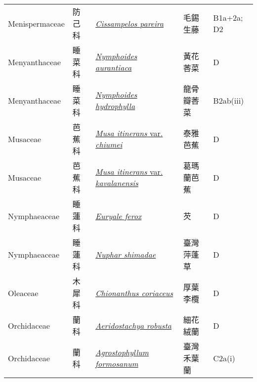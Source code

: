 {\begin{longtable}{p{2.5cm}p{2cm}p{5cm}p{2.5cm}p{3cm}}
    Menispermaceae & 防己科 & \href{http://www.theplantlist.org/tpl1.1/search?q=Cissampelos+pareira}{\textit{Cissampelos pareira} } & 毛錫生藤 & B1a+2a; D2 \index{Cissampelos@\textit{Cissampelos}!pareira@\textit{pareira}}  \index{毛錫生藤} \\
    Menyanthaceae & 睡菜科 & \href{http://www.theplantlist.org/tpl1.1/search?q=Nymphoides+aurantiaca}{\textit{Nymphoides aurantiaca} } & 黃花莕菜 & D \index{Nymphoides@\textit{Nymphoides}!aurantiaca@\textit{aurantiaca}}  \index{黃花莕菜} \\
    Menyanthaceae & 睡菜科 & \href{http://www.theplantlist.org/tpl1.1/search?q=Nymphoides+hydrophylla}{\textit{Nymphoides hydrophylla} } & 龍骨瓣莕菜 & B2ab(iii) \index{Nymphoides@\textit{Nymphoides}!hydrophylla@\textit{hydrophylla}}  \index{龍骨瓣莕菜} \\
    Musaceae & 芭蕉科 & \href{http://www.theplantlist.org/tpl1.1/search?q=Musa+itinerans+var.+chiumei}{\textit{Musa itinerans} var. \textit{chiumei} } & 泰雅芭蕉 & D \index{Musa@\textit{Musa}!itinerans@\textit{itinerans}!var. chiumei@var. \textit{chiumei}}  \index{泰雅芭蕉} \\
    Musaceae & 芭蕉科 & \href{http://www.theplantlist.org/tpl1.1/search?q=Musa+itinerans+var.+kavalanensis}{\textit{Musa itinerans} var. \textit{kavalanensis} } & 葛瑪蘭芭蕉 & D \index{Musa@\textit{Musa}!itinerans@\textit{itinerans}!var. kavalanensis@var. \textit{kavalanensis}}  \index{葛瑪蘭芭蕉} \\
    Nymphaeaceae & 睡蓮科 & \href{http://www.theplantlist.org/tpl1.1/search?q=Euryale+ferox}{\textit{Euryale ferox} } & 芡 & D \index{Euryale@\textit{Euryale}!ferox@\textit{ferox}}  \index{芡} \\
    Nymphaeaceae & 睡蓮科 & \href{http://www.theplantlist.org/tpl1.1/search?q=Nuphar+shimadae}{\textit{Nuphar shimadae} } & 臺灣萍蓬草 & D \index{Nuphar@\textit{Nuphar}!shimadae@\textit{shimadae}}  \index{臺灣萍蓬草} \\
    Oleaceae & 木犀科 & \href{http://www.theplantlist.org/tpl1.1/search?q=Chionanthus+coriaceus}{\textit{Chionanthus coriaceus} } & 厚葉李欖 & D \index{Chionanthus@\textit{Chionanthus}!coriaceus@\textit{coriaceus}}  \index{厚葉李欖} \\
    Orchidaceae & 蘭科 & \href{http://www.theplantlist.org/tpl1.1/search?q=Aeridostachya+robusta}{\textit{Aeridostachya robusta} } & 細花絨蘭 & D \index{Aeridostachya@\textit{Aeridostachya}!robusta@\textit{robusta}}  \index{細花絨蘭} \\
    Orchidaceae & 蘭科 & \href{http://www.theplantlist.org/tpl1.1/search?q=Agrostophyllum+formosanum}{\textit{Agrostophyllum formosanum} } & 臺灣禾葉蘭 & C2a(i) \index{Agrostophyllum@\textit{Agrostophyllum}!formosanum@\textit{formosanum}}  \index{臺灣禾葉蘭} \\

\end{longtable}}
